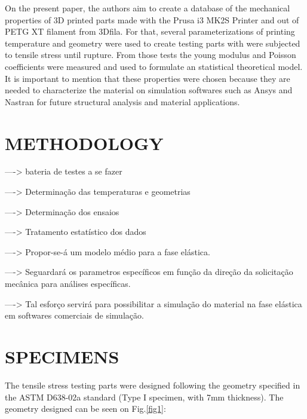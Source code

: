 \documentclass[10pt,fleqn,a4paper,twoside]{article}
\begin{document}
On the present paper, the authors aim to create a database of the mechanical properties of 3D printed parts made with the Prusa i3 MK2S Printer and out of PETG XT filament from 3Dfila. For that, several parameterizations of printing temperature and geometry were used to create testing parts with were subjected to tensile stress until rupture. From those tests the young modulus and Poisson coefficients were measured and used to formulate an statistical theoretical model. It is important to mention that these properties were chosen because they are needed to characterize the material on simulation softwares such as Ansys and Nastran for future structural analysis and material applications.  



\section{METHODOLOGY}

----> bateria de testes a se fazer

----> Determinação das temperaturas e geometrias

----> Determinação dos ensaios
	
----> Tratamento estatístico dos dados

----> Propor-se-á um modelo médio para a fase elástica. 

----> Seguardará os parametros específicos em função da direção da solicitação mecânica para análises específicas.

----> Tal esforço servirá para possibilitar a simulação do material na fase elástica em softwares comerciais de simulação.





\section{SPECIMENS}

The tensile stress testing parts were designed following the geometry specified in the ASTM D638-02a standard (Type I specimen, with 7mm thickness). The geometry designed can be seen on Fig.\ref{fig1}:
\end{document}
